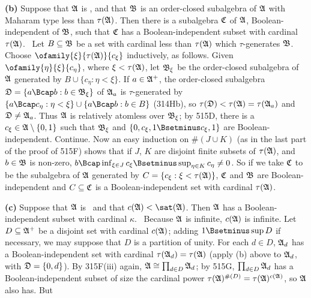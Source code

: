 {{\bf (b)} Suppose that $\frak A$ is \Mth, and that $\frak B$ is an
order-closed subalgebra of $\frak A$ with Maharam type less than
$\tau(\frak A)$.   Then there is a subalgebra $\frak C$ of $\frak A$,
Boolean-independent of $\frak B$, such that $\frak C$ has a
Boolean-independent subset with cardinal $\tau(\frak A)$.   \Prf\ Let
$B\subseteq\frak B$ be a set with cardinal less than $\tau(\frak A)$ which
$\tau$-generates $\frak B$.   Choose
$\ofamily{\xi}{\tau(\frak A)}{c_{\xi}}$ inductively, as follows.   Given
$\ofamily{\eta}{\xi}{c_{\eta}}$, where $\xi<\tau(\frak A)$, let
$\frak B_{\xi}$ be the order-closed subalgebra of $\frak A$ generated by
$B\cup\{c_{\eta}:\eta<\xi\}$.   If $a\in\frak A^+$, the
order-closed subalgebra
$\frak D=\{a\Bcap b:b\in\frak B_{\xi}\}$ of $\frak A_a$ is
$\tau$-generated by
$\{a\Bcap c_{\eta}:\eta<\xi\}\cup\{a\Bcap b:b\in B\}$ (314Hb), so
$\tau(\frak D)<\tau(\frak A)=\tau(\frak A_a)$ and
$\frak D\ne\frak A_a$.   Thus $\frak A$ is relatively atomless over
$\frak B_{\xi}$;  by 515D, there is a
$c_{\xi}\in\frak A\setminus\{0,1\}$ such that $\frak B_{\xi}$ and
$\{0,c_{\xi},1\Bsetminus c_{\xi},1\}$ are Boolean-independent.
Continue.   Now an easy induction on $\#(J\cup K)$ (as in the last part
of the proof of 515F) shows that if $J$,
$K$ are disjoint finite subsets of $\tau(\frak A)$, and $b\in\frak B$ is
non-zero,
$b\Bcap\inf_{\xi\in J}c_{\xi}\Bsetminus\sup_{\eta\in K}c_{\eta}\ne 0$.
So if we take $\frak C$ to be the subalgebra of $\frak A$ generated by
$C=\{c_{\xi}:\xi<\tau(\frak A)\}$, $\frak C$ and $\frak B$ are
Boolean-independent and $C\subseteq\frak C$ is a Boolean-independent set
with cardinal $\tau(\frak A)$.\ \Qed

\medskip

{\bf (c)} Suppose that $\frak A$ is \Mth\ and that
$c(\frak A)<\sat(\frak A)$.   Then $\frak A$ has a Boolean-independent
subset with cardinal $\kappa$.   \Prf\ Because $\frak A$ is infinite,
$c(\frak A)$ is infinite.   Let $D\subseteq\frak A^+$ be a
disjoint set with cardinal $c(\frak A)$;  adding $1\Bsetminus\sup D$ if
necessary, we may suppose that $D$ is a partition of unity.   For each
$d\in D$, $\frak A_d$ has a Boolean-independent set with cardinal
$\tau(\frak A_d)=\tau(\frak A)$ (apply (b) above to $\frak A_d$, with
$\frak D=\{0,d\}$).   By
315F(iii) again, $\frak A\cong\prod_{d\in D}\frak A_d$;  by 515G,
$\prod_{d\in D}\frak A_d$ has a Boolean-independent subset of size the
cardinal power
$\tau(\frak A)^{\#(D)}=\tau(\frak A)^{c(\frak A)}$, so $\frak A$ also
has.   But


}
